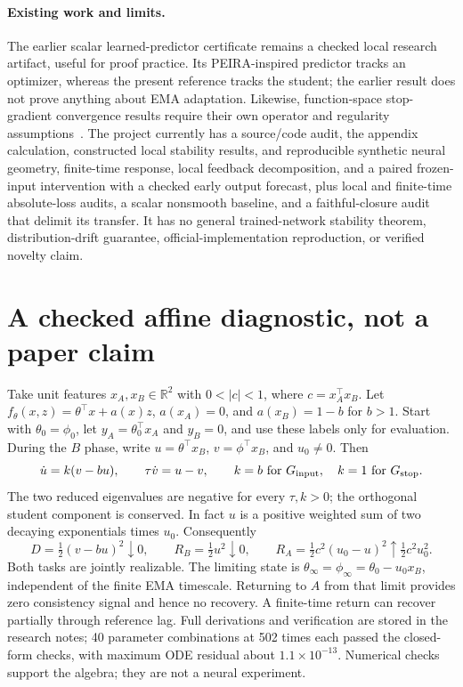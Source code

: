 \documentclass[11pt,a4paper]{article}
\newcommand{\R}{\mathbb{R}}
\begin{document}
\paragraph{Existing work and limits.}
The earlier scalar learned-predictor certificate remains a checked local
research artifact, useful for proof practice. Its PEIRA-inspired predictor
tracks an optimizer, whereas the present reference tracks the student;
the earlier result does not prove anything about EMA adaptation. Likewise,
function-space stop-gradient convergence results require their own operator
and regularity assumptions~\cite{stopgrads}. The project currently has a source/code audit, the appendix calculation,
constructed local stability results, and reproducible synthetic neural
geometry, finite-time response, local feedback decomposition, and a
paired frozen-input intervention with a checked early output forecast,
plus local and finite-time absolute-loss audits, a scalar nonsmooth
baseline, and a faithful-closure audit that delimit its transfer.
It has no general trained-network stability theorem,
distribution-drift guarantee, official-implementation reproduction,
or verified novelty claim.

\medskip
{}

\appendix
\section{A checked affine diagnostic, not a paper claim}
Take unit features $x_A,x_B\in\R^2$ with $0<|c|<1$, where
$c=x_A^\top x_B$. Let $f_\theta(x,z)=\theta^\top x+a(x)z$,
$a(x_A)=0$, and $a(x_B)=1-b$ for $b>1$. Start with
$\theta_0=\phi_0$, let $y_A=\theta_0^\top x_A$ and $y_B=0$, and use
these labels only for evaluation. During the $B$ phase, write
$u=\theta^\top x_B$, $v=\phi^\top x_B$, and $u_0\ne0$. Then
\begin{equation}
 \dot u=k(v-bu),\qquad \tau\dot v=u-v,
 \qquad k=b\ \text{for }G_{\rm input},\quad k=1\ \text{for }G_{\rm stop}.
 \label{eq:toy}
\end{equation}
The two reduced eigenvalues are negative for every $\tau,k>0$; the
orthogonal student component is conserved. In fact $u$ is a positive
weighted sum of two decaying exponentials times $u_0$. Consequently
\begin{equation}
 D=\tfrac12(v-bu)^2\downarrow0,\qquad
 R_B=\tfrac12u^2\downarrow0,\qquad
 R_A=\tfrac12c^2(u_0-u)^2\uparrow\tfrac12c^2u_0^2.
 \label{eq:toyresult}
\end{equation}
Both tasks are jointly realizable. The limiting state is
$\theta_\infty=\phi_\infty=\theta_0-u_0x_B$, independent of the finite
EMA timescale. Returning to $A$ from that limit provides zero consistency
signal and hence no recovery. A finite-time return can recover partially
through reference lag. Full derivations and verification are stored in
the research notes; 40 parameter combinations at 502 times each passed
the closed-form checks, with maximum ODE residual about $1.1\times10^{-13}$.
Numerical checks support the algebra; they are not a neural experiment.
\end{document}

